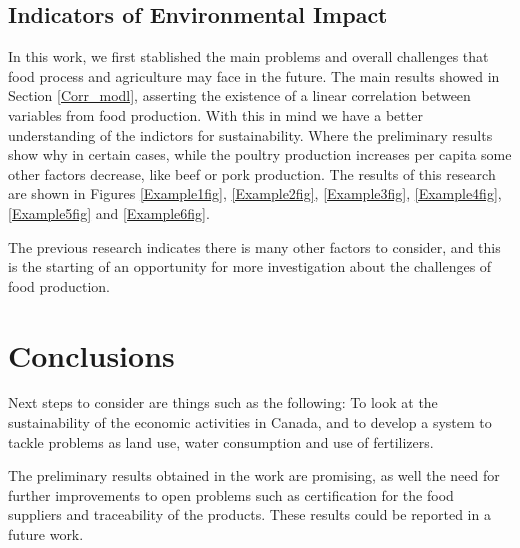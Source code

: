 \documentclass[11pt]{article}
\numberwithin{equation}{section}
\begin{document}

\subsection{Indicators of Environmental Impact}\label{indicators}

In this work, we first stablished the main problems and overall challenges that  food process and agriculture  may face in the future. The main results showed in Section  \ref{Corr_modl}, asserting the existence of a linear correlation between  variables from food production. With this in mind we have a better understanding of the indictors for sustainability. Where the preliminary results show why in certain cases, while the poultry production increases per capita some other factors decrease, like beef or pork production. The results of this research are shown in Figures \ref{Example1fig}, \ref{Example2fig}, \ref{Example3fig}, \ref{Example4fig}, \ref{Example5fig}  and \ref{Example6fig}.

The previous research indicates there is many other factors to consider, and this is the starting of an opportunity for more investigation about the challenges of food production. 


\section{Conclusions}

Next steps to consider are things such as the following: To look at the sustainability of the economic activities in Canada, and to develop a system to tackle problems as land use, water consumption and use of fertilizers. 

The preliminary results obtained in the work are promising, as well the need for further improvements to open  problems such as certification for the food suppliers and traceability of the products. These results could be reported in a future work.

\end{document}
